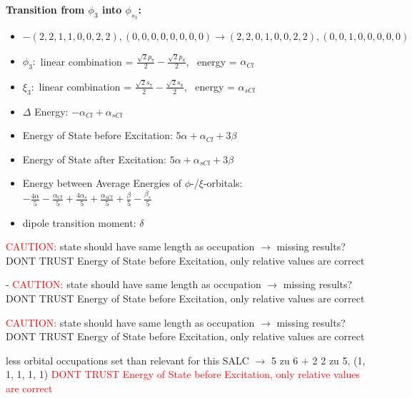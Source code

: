\documentclass[12pt,a4paper]{article}
\begin{document}
        \noindent\textbf{Transition from $\phi_{3}$ into $\phi_{s_{3}}$:}
        \begin{itemize}
            \item $- (2, 2, 1, 1, 0, 0, 2, 2), (0, 0, 0, 0, 0, 0, 0, 0) \rightarrow (2, 2, 0, 1, 0, 0, 2, 2), (0, 0, 1, 0, 0, 0, 0, 0)$
        
            \item $\phi_{3}:$ linear combination = $\frac{\sqrt{2} p_{7}}{2} - \frac{\sqrt{2} p_{8}}{2}$, \
            energy = $\alpha_{Cl}$
            
            \item $\xi_{3}:$ linear combination = $\frac{\sqrt{2} s_{7}}{2} - \frac{\sqrt{2} s_{8}}{2}$, \
            energy = $\alpha_{s Cl}$
            
            \item $\Delta$ Energy: $- \alpha_{Cl} + \alpha_{s Cl}$
            \item Energy of State before Excitation: $5 \alpha + \alpha_{Cl} + 3 \beta$
            \item Energy of State after Excitation: $5 \alpha + \alpha_{s Cl} + 3 \beta$
            \item Energy between Average Energies of $\phi$-/$\xi$-orbitals: \
            $- \frac{4 \alpha}{5} - \frac{\alpha_{Cl}}{5} + \frac{4 \alpha_{s}}{5} + \frac{\alpha_{s Cl}}{5} + \frac{\beta}{5} - \frac{\beta_{s}}{5}$
        
            \item dipole transition moment: $\delta$
        
        \end{itemize}
        
	\textcolor{red}{CAUTION:} state should have same length as occupation $\rightarrow$ missing results?
	DONT TRUST \glqq{}Energy of State before Excitation\grqq{}, only relative values are correct

 - 	\textcolor{red}{CAUTION:} state should have same length as occupation $\rightarrow$ missing results?
	DONT TRUST \glqq{}Energy of State before Excitation\grqq{}, only relative values are correct

	\textcolor{red}{CAUTION:} state should have same length as occupation $\rightarrow$ missing results?
	DONT TRUST \glqq{}Energy of State before Excitation\grqq{}, only relative values are correct

less orbital occupations set than relevant for this SALC $\rightarrow$ 
5 zu 6 + 2 
2 zu 5, (1, 1, 1, 1, 1) 
\textcolor{red}{DONT TRUST \glqq{}Energy of State before Excitation\grqq{}, only relative values are correct}
\end{document}
